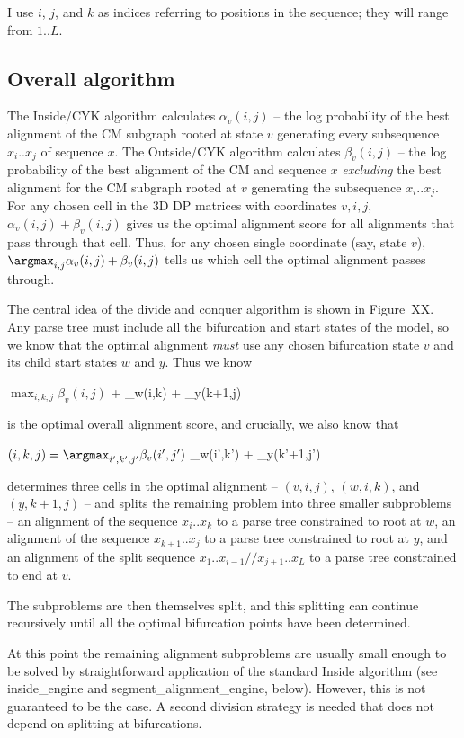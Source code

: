 I use $i$, $j$, and $k$ as indices referring to positions in the
sequence; they will range from $1..L$.

\subsection{Overall algorithm}

The Inside/CYK algorithm calculates $\alpha_v(i,j)$ -- the log
probability of the best alignment of the CM subgraph rooted at state
$v$ generating every subsequence $x_i..x_j$ of sequence $x$.  The
Outside/CYK algorithm calculates $\beta_v(i,j)$ -- the log probability
of the best alignment of the CM and sequence $x$
\emph{excluding} the best alignment for the CM subgraph rooted at
$v$ generating the subsequence $x_i..x_j$.  For any chosen cell in the
3D DP matrices with coordinates $v,i,j$, $\alpha_v(i,j) +
\beta_v(i,j)$ gives us the optimal alignment score for all alignments
that pass through that cell. Thus, for any chosen single coordinate
(say, state $v$), $\argmax_{i,j} \alpha_{v}(i,j) +
\beta_{v}(i,j)$ tells us which cell the optimal alignment
passes through.

The central idea of the divide and conquer algorithm is shown in
Figure~XX. Any parse tree must include all the bifurcation and start
states of the model, so we know that the optimal alignment \emph{must}
use any chosen bifurcation state $v$ and its child start states $w$
and $y$. Thus we know

      $\max_{i,k,j} \beta_{v}(i,j)$ + \alpha_{w}(i,k) + \alpha_{y}(k+1,j) 

is the optimal overall alignment score, and crucially, we also know
that

      $(i,k,j) = \argmax_{i',k',j'}  \beta_{v}(i',j')$  \alpha_{w}(i',k') + \alpha_{y}(k'+1,j') 

determines three cells in the optimal alignment -- $(v,i,j)$,
$(w,i,k)$, and $(y,k+1,j)$ -- and splits the remaining problem into
three smaller subproblems -- an alignment of the sequence
$x_{i}..x_{k}$ to a parse tree constrained to root at $w$, an
alignment of the sequence $x_{k+1}..x_{j}$ to a parse tree constrained
to root at $y$, and an alignment of the split sequence
$x_1..x_{i-1}//x_{j+1}..x_L$ to a parse tree constrained to end at
$v$.

The subproblems are then themselves split, and this splitting can
continue recursively until all the optimal bifurcation points have
been determined.

At this point the remaining alignment subproblems are usually small
enough to be solved by straightforward application of the standard
Inside algorithm (see inside_engine and segment_alignment_engine,
below). However, this is not guaranteed to be the case. A second
division strategy is needed that does not depend on splitting at
bifurcations.

